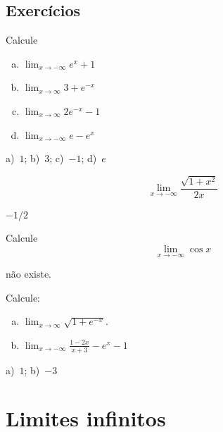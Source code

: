 \cleardoublepage\documentclass[../main.tex]{subfiles}
\begin{document}
\subsection{Exercícios}
\begin{exer}
  Calcule
  \begin{multicols}{2}
  \begin{enumerate}[a)]
\item $\displaystyle \lim_{x\to -\infty} e^x+1$
\item $\displaystyle \lim_{x\to \infty} 3 + e^{-x}$
\item $\displaystyle \lim_{x\to \infty} 2e^{-x}-1$
\item $\displaystyle \lim_{x\to -\infty} e-e^{x}$
\end{enumerate}
  \end{multicols}
\end{exer}
\begin{resp}
  a)~$1$; b)~$3$; c)~$-1$; d)~$e$
\end{resp}

\begin{exer}
    \begin{equation*}
    \lim_{x\to -\infty} \frac{\sqrt{1+x^2}}{2x}
  \end{equation*}
\end{exer}


\begin{resp}
  $-1/2$
\end{resp}

\begin{exer}
  Calcule
  \begin{equation*}
    \lim_{x\to -\infty} \cos x
  \end{equation*}
\end{exer}
\begin{resp}
  não existe.
\end{resp}

\begin{exer}
  Calcule:
  \begin{enumerate}[a)]
  \item $\displaystyle\lim_{x\to \infty} \sqrt{1+e^{-x}}$.
  \item $\displaystyle\lim_{x\to -\infty} \frac{1-2x}{x+3} -e^{x} - 1$
  \end{enumerate}
\end{exer}
\begin{resp}
  a)~$1$; b)~$-3$
\end{resp}
\newpage
\section{Limites infinitos}\hypertarget{LimInf}{}\label{sec:limites_inf}
\end{document}
